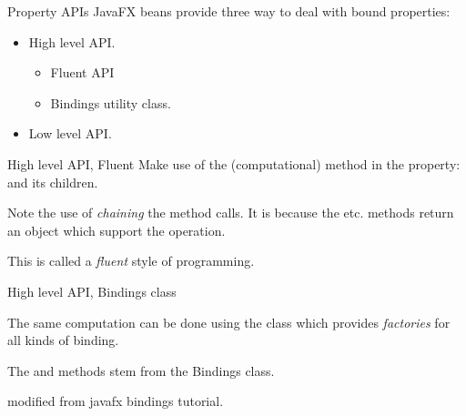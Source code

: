 \begin{frame}{Property APIs}
  JavaFX beans provide three way to deal with bound properties:
  \begin{itemize}
  \item High level API.
    \begin{itemize}
    \item Fluent API
    \item Bindings utility class.
    \end{itemize}
  \item Low level API.
  \end{itemize}
\end{frame}

\begin{frame}{High level API, Fluent}
  Make use of the (computational) method in the property:
   and its children.

  

Note the use of \textit{chaining} the method calls. It is because
the  etc. methods return an object which support the
operation.

This is called a \textit{fluent} style of programming.

\end{frame}

\begin{frame}{High level API, Bindings class}

  The same computation can be done using the  class
  which provides \textit{factories} for all kinds of binding.

  

The  and  methods stem from the Bindings class.

  

modified from javafx bindings tutorial.
\end{frame}

